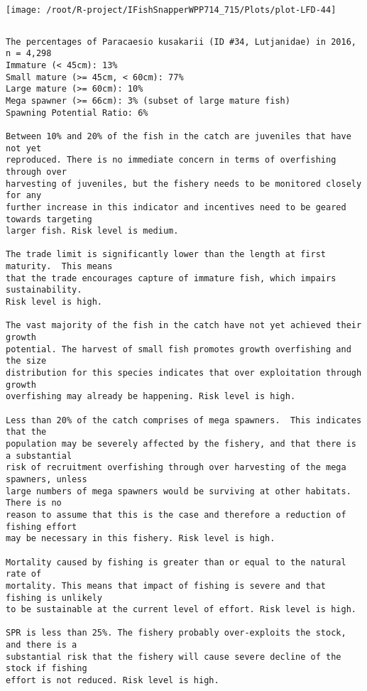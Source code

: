 \documentclass{report}\usepackage[]{graphicx}\usepackage[]{color}
\makeatletter
\def\maxwidth{ %
  \ifdim\Gin@nat@width>\linewidth
    \linewidth
  \else
    \Gin@nat@width
  \fi
}
\newenvironment{kframe}{%
 \def\at@end@of@kframe{}%
 \ifinner\ifhmode%
  \def\at@end@of@kframe{\end{minipage}}%
  \begin{minipage}{\columnwidth}%
 \fi\fi%
 \def\FrameCommand##1{\hskip\@totalleftmargin \hskip-\fboxsep
 \colorbox{shadecolor}{##1}\hskip-\fboxsep
     \hskip-\linewidth \hskip-\@totalleftmargin \hskip\columnwidth}%
 \MakeFramed {\advance\hsize-\width
   \@totalleftmargin\z@ \linewidth\hsize
   \@setminipage}}%
 {\par\unskip\endMakeFramed%
 \at@end@of@kframe}
\newenvironment{knitrout}{}{} %
\makeatother
\begin{document}
\begin{knitrout}
\texttt{[image: /root/R-project/IFishSnapperWPP714\_715/Plots/plot-LFD-44]} 
\begin{kframe}\begin{verbatim}
\end{verbatim}
\end{kframe}
\clearpage
\newpage
\begin{kframe}\begin{verbatim}The percentages of Paracaesio kusakarii (ID #34, Lutjanidae) in 2016, n = 4,298
Immature (< 45cm): 13%
Small mature (>= 45cm, < 60cm): 77%
Large mature (>= 60cm): 10%
Mega spawner (>= 66cm): 3% (subset of large mature fish)
Spawning Potential Ratio: 6%
 
Between 10% and 20% of the fish in the catch are juveniles that have not yet
reproduced. There is no immediate concern in terms of overfishing through over
harvesting of juveniles, but the fishery needs to be monitored closely for any
further increase in this indicator and incentives need to be geared towards targeting
larger fish. Risk level is medium.

The trade limit is significantly lower than the length at first maturity.  This means
that the trade encourages capture of immature fish, which impairs sustainability.
Risk level is high.

The vast majority of the fish in the catch have not yet achieved their growth
potential. The harvest of small fish promotes growth overfishing and the size
distribution for this species indicates that over exploitation through growth
overfishing may already be happening. Risk level is high.

Less than 20% of the catch comprises of mega spawners.  This indicates that the
population may be severely affected by the fishery, and that there is a substantial
risk of recruitment overfishing through over harvesting of the mega spawners, unless
large numbers of mega spawners would be surviving at other habitats. There is no
reason to assume that this is the case and therefore a reduction of fishing effort
may be necessary in this fishery. Risk level is high.
 
Mortality caused by fishing is greater than or equal to the natural rate of
mortality. This means that impact of fishing is severe and that fishing is unlikely
to be sustainable at the current level of effort. Risk level is high.
 
SPR is less than 25%. The fishery probably over-exploits the stock, and there is a
substantial risk that the fishery will cause severe decline of the stock if fishing
effort is not reduced. Risk level is high.
 

\end{verbatim}
\end{kframe}
\end{knitrout}
\end{document}
